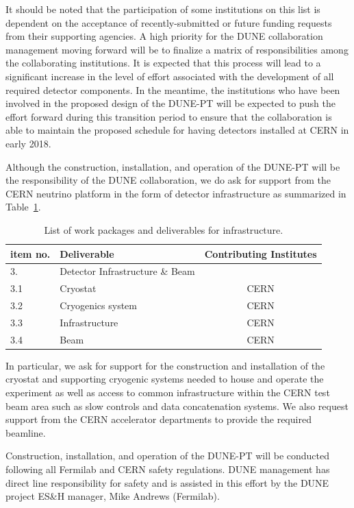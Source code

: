 %
 It should be noted that the participation of some institutions on this list is dependent on 
the acceptance of recently-submitted or future funding requests from their supporting agencies.  A high priority for the DUNE 
collaboration management moving forward will be to finalize a matrix of responsibilities among the collaborating institutions.  It 
is expected that this process will lead to a significant increase in the level of effort associated with the development of all 
required detector components.  In the meantime, the institutions who have been involved in the proposed design of the DUNE-PT
will be expected to push the effort forward during this transition period to ensure that the collaboration is able to maintain the 
proposed schedule for having detectors installed at CERN in early 2018.

Although the construction, installation, and operation of the DUNE-PT will be the responsibility of the DUNE collaboration, we do 
ask for support from the CERN neutrino platform in the form of detector infrastructure as summarized in Table~\ref{tab:wbs-infra}.  
%
\begin{table}[h]
\centering
\begin{tabular}{|l l c|}
\hline
\textbf{item no. } & \textbf{Deliverable}  & \textbf{Contributing Institutes}  \\ \hline

3.   & Detector Infrastructure \& Beam & \\
3.1  & Cryostat &  CERN \\
3.2  & Cryogenics system   &  CERN \\
3.3  & Infrastructure  & CERN \\ 
3.4 & Beam & CERN \\ \hline

\end{tabular}
\caption{List of work packages and deliverables for infrastructure.} 
\label{tab:wbs-infra}
\end{table}
%
In particular, we ask for support for the 
construction and installation of the cryostat and supporting cryogenic systems needed to house and operate the experiment as well 
as access to common infrastructure within the CERN test beam area such as slow controls and data concatenation systems.  We also 
request support from the CERN accelerator departments to provide the required beamline.

Construction, installation, and operation of the DUNE-PT will be conducted following all Fermilab and CERN safety regulations.  
DUNE management has direct line responsibility for safety and is assisted in this effort by the DUNE project ES\&H manager, 
Mike Andrews (Fermilab). 
              
